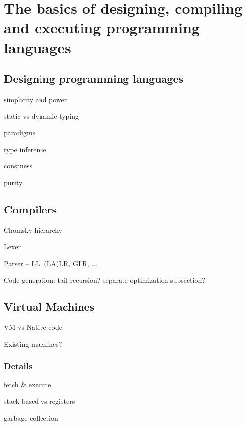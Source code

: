 \chapter{The basics of designing, compiling and executing programming languages}


    \section{Designing programming languages}
    
        simplicity and power
        
        static vs dynamic typing
        
        paradigms
        
        type inference
        
        constness
        
        purity
    
    \section{Compilers}
    
        Chomsky hierarchy
        
        Lexer
        
        Parser -- LL, (LA)LR, GLR, ...
        
        Code generation: tail recursion? separate optimization subsection?
    
    \section{Virtual Machines}
    
        VM vs Native code
        
        Existing machines?
        
        \subsection{Details} %
            fetch \& execute
            
            stack based vs registers
            
            garbage collection
            
